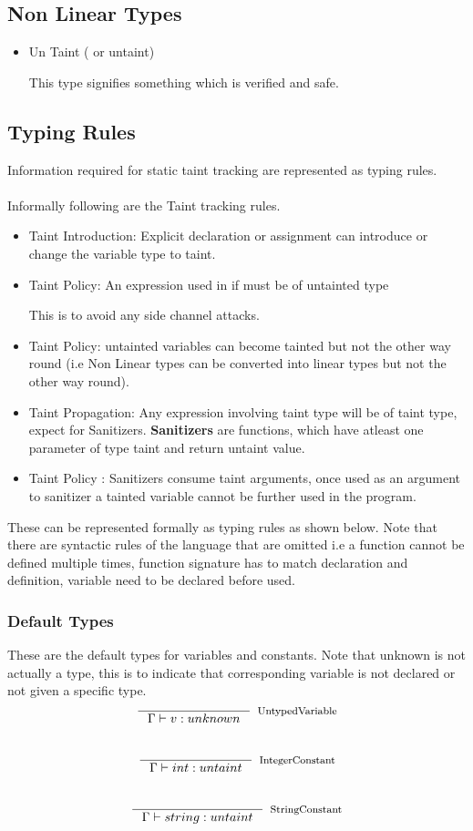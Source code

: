 \documentclass[11pt, pdftex]{article}
\begin{document}
\subsection{Non Linear Types}
\begin{itemize}
\item Un Taint ( or untaint)
\begin{description}
This type signifies something which is verified and safe.
\end{description}
\end{itemize}
\subsection{Typing Rules}
Information required for static taint tracking are represented as typing rules.
\\
\\
Informally following are the Taint tracking rules.
\begin{itemize}
\item Taint Introduction: Explicit declaration or assignment can introduce or change the variable type to taint.
\item Taint Policy: An expression used in if must be of untainted type
\begin{description}
This is to avoid any side channel attacks.
\end{description}
\item Taint Policy: untainted variables can become tainted but not the other way round (i.e Non Linear types can be converted into linear types but not the other way round).
\item Taint Propagation: Any expression involving taint type will be of taint type, expect for Sanitizers.
{\bf Sanitizers} are functions, which have atleast one parameter of type taint and return untaint value.
\item Taint Policy : Sanitizers consume taint arguments, once used as an argument to sanitizer a tainted variable cannot be further used in the program.
\end{itemize}
These can be represented formally as typing rules as shown below. Note that there are syntactic rules of the language that are omitted i.e a function cannot be defined multiple times, function signature has to match declaration and definition, variable need to be declared before used.
\subsubsection{Default Types}
These are the default types for variables and constants. Note that unknown is not actually a type, this is to indicate that corresponding variable is not declared or not given a specific type.
$$ \inference {}{\Gamma \vdash v:unknown}[UntypedVariable]$$
\\
$$ \inference {}{\Gamma \vdash int:untaint}[IntegerConstant]$$
\\
$$ \inference {}{\Gamma \vdash string:untaint}[StringConstant]$$
\end{document}

